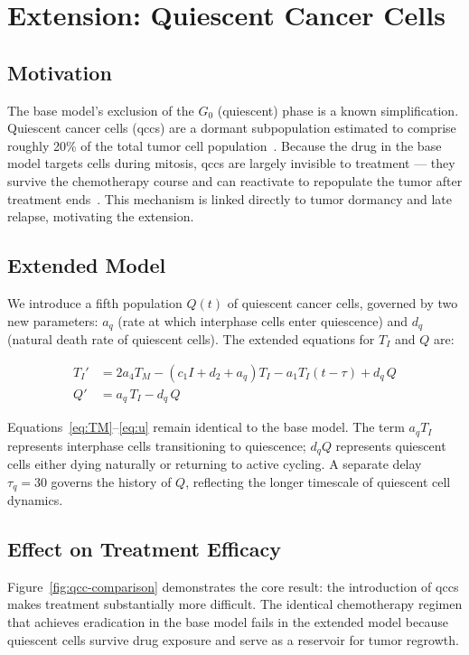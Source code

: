 \section{Extension: Quiescent Cancer Cells}
\label{sec:extension}

\subsection{Motivation}

The base model's exclusion of the $G_0$ (quiescent) phase is a known simplification. Quiescent cancer cells (\gls{qcc}s) are a dormant subpopulation estimated to comprise roughly 20\% of the total tumor cell population~\cite{villasana2003}. Because the drug in the base model targets cells during mitosis, \gls{qcc}s are largely invisible to treatment --- they survive the chemotherapy course and can reactivate to repopulate the tumor after treatment ends~\cite{Davis2019}. This mechanism is linked directly to tumor dormancy and late relapse, motivating the extension.

\subsection{Extended Model}

We introduce a fifth population $Q(t)$ of quiescent cancer cells, governed by two new parameters: $a_q$ (rate at which interphase cells enter quiescence) and $d_q$ (natural death rate of quiescent cells). The extended equations for $T_I$ and $Q$ are:

\begin{align}
  T_I' &= 2a_4T_M - (c_1I + d_2 + a_q)T_I - a_1T_I(t-\tau) + d_q\, Q \\
  Q'   &= a_q\, T_I - d_q\, Q
\end{align}

Equations~\ref{eq:TM}--\ref{eq:u} remain identical to the base model. The term $a_q T_I$ represents interphase cells transitioning to quiescence; $d_q Q$ represents quiescent cells either dying naturally or returning to active cycling. A separate delay $\tau_q = 30$ governs the history of $Q$, reflecting the longer timescale of quiescent cell dynamics.

\subsection{Effect on Treatment Efficacy}

Figure~\ref{fig:qcc-comparison} demonstrates the core result: the introduction of \gls{qcc}s makes treatment substantially more difficult. The identical chemotherapy regimen that achieves eradication in the base model fails in the extended model because quiescent cells survive drug exposure and serve as a reservoir for tumor regrowth.

